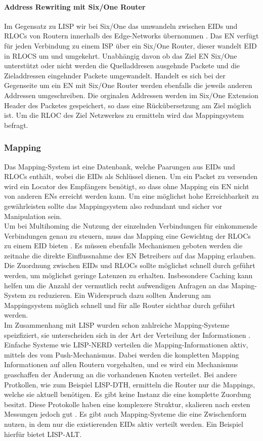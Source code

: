 \paragraph{Address Rewriting mit Six/One Router}
Im Gegensatz zu LISP wir bei Six/One das umwandeln zwischen EIDs und RLOCs von Routern innerhalb des Edge-Networks übernommen \cite{vogt:2008:six}. Das EN verfügt für jeden Verbindung zu einem ISP über ein Six/One Router, dieser wandelt EID in RLOCS um und umgekehrt. Unabhängig davon ob das Ziel EN Six/One unterstützt oder nicht werden die Quelladdresen ausgehnde Packete und die Zieladdressen eingehnder Packete umgewandelt. Handelt es sich bei der Gegenseite um ein EN mit Six/One Router werden ebenfalls die jeweils anderen Addressen umgeschreiben. Die orginalen Addressen werden im Six/One Extension Header des Packetes gespeichert, so dass eine Rückübersetzung am Ziel möglich ist. Um die RLOC des Ziel Netzwerkes zu ermitteln wird das Mappingsystem befragt.

\subsubsection{Mapping}
Das Mapping-System ist eine Datenbank, welche Paarungen aus EIDs und RLOCs enthält, wobei die EIDs als Schlüssel dienen. Um ein Packet zu versenden wird ein Locator des Empfängers benötigt, so dass ohne Mapping ein EN nicht von anderen ENs erreicht werden kann. Um eine möglichst hohe Erreichbarkeit zu gewährleisten sollte das Mappingsystem also redundant und sicher vor Manipulation sein. \\
Um bei Multihoming die Nutzung der einzelnden Verbindungen für einkommende Verbindungen genau zu steuern, muss das Mapping eine Gewichtng der RLOCs zu einem EID bieten \cite{mathy:2008:dht}. Es müssen ebenfalls Mechanismen geboten werden die zeitnahe die direkte Einflussnahme des EN Betreibers auf das Mapping erlauben. \\
Die Zuordnung zwischen EIDs und RLOCs sollte möglichst schnell durch geführt werden, um möglichst geringe Latenzen zu erhalten. Insbesondere Caching kann helfen um die Anzahl der vermutlich recht aufwendigen Anfragen an das Maping-System zu reduzieren. Ein Widerspruch dazu sollten Änderung am Mappingsystem möglich schnell und für alle Router sichtbar durch geführt werden. \\
Im Zusammenhang mit LISP wurden schon zahlreiche Mapping-Systeme speizfiziert, sie unterscheiden sich in der Art der Verteilung der Informationen \cite{mathy:2008:dht}. Einfache Systeme wie LISP-NERD verteilen die Mapping-Informationen aktiv, mittels des vom Push-Mechanismus. Dabei werden die kompletten Mapping Informationen auf allen Routern vorgehalten, und es wird ein Mechanismus geaschaffen der Änderung an die vorhandenen Knoten verteilet. Bei andere Protkollen, wie zum Beispiel LISP-DTH, ermitteln die Router nur die Mappings, welche sie aktuell benötigen. Es gibt keine Instanz die eine komplette Zuordung besitzt. Diese Protokolle haben eine komplexere Struktur, skalieren nach ersten Messungen jedoch gut \cite{iannone:2007:cost}. Es gibt auch Mapping-Systeme die eine Zwischenform nutzen, in dem nur die existierenden EIDs aktiv verteilt werden. Ein Beispiel hierfür bietet LISP-ALT.

